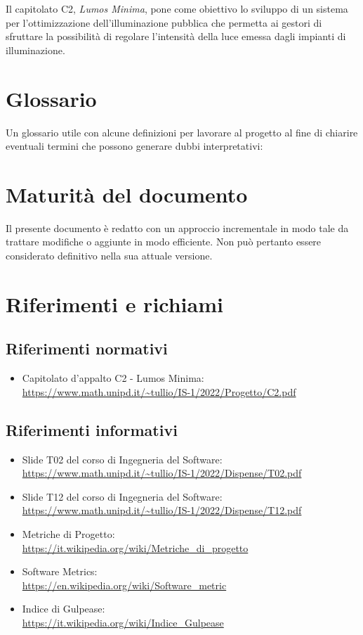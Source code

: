 Il capitolato C2, \textit{Lumos Minima}, pone come obiettivo lo sviluppo di un sistema per l'ottimizzazione dell'illuminazione pubblica che permetta ai gestori di sfruttare la possibilità di regolare l'intensità della luce emessa dagli impianti di illuminazione.

\section{Glossario}
Un glossario utile con alcune definizioni per lavorare al progetto al fine di chiarire eventuali termini che possono generare dubbi interpretativi:

\section{Maturità del documento}
Il presente documento è redatto con un approccio incrementale in modo tale da trattare modifiche o aggiunte in modo efficiente. Non può pertanto essere considerato definitivo nella sua attuale versione.

\section{Riferimenti e richiami}
\subsection{Riferimenti normativi}
\begin{itemize}
    \item Capitolato d'appalto C2 - Lumos Minima: \\ \url{https://www.math.unipd.it/~tullio/IS-1/2022/Progetto/C2.pdf}
\end{itemize}

\subsection{Riferimenti informativi}
\begin{itemize}
    \item Slide T02 del corso di Ingegneria del Software: \\ \url{https://www.math.unipd.it/~tullio/IS-1/2022/Dispense/T02.pdf}
    \item Slide T12 del corso di Ingegneria del Software: \\ \url{https://www.math.unipd.it/~tullio/IS-1/2022/Dispense/T12.pdf}
    \item Metriche di Progetto: \\ \url{https://it.wikipedia.org/wiki/Metriche_di_progetto}
    \item Software Metrics: \\ \url{https://en.wikipedia.org/wiki/Software_metric}
    \item Indice di Gulpease: \\ \url{https://it.wikipedia.org/wiki/Indice_Gulpease}
\end{itemize}